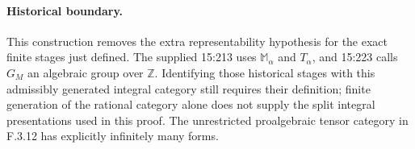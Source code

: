 \paragraph{Historical boundary.}
This construction removes the extra representability hypothesis for the exact finite stages just defined. The supplied 15:213 uses $\mathbb M_\alpha$ and $T_\alpha$, and 15:223 calls $G_M$ an algebraic group over $\mathbb Z$. Identifying those historical stages with this admissibly generated integral category still requires their definition; finite generation of the rational category alone does not supply the split integral presentations used in this proof. The unrestricted proalgebraic tensor category in F.3.12 has explicitly infinitely many forms.
